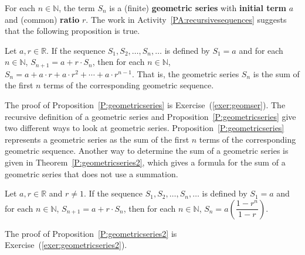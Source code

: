 \noindent
For each  $n \in \mathbb{N}$, the term  $S_n $ is a (finite) \textbf{geometric series}
\label{geometricseries}
%
 with \textbf{initial term}  $a$  and (common) \textbf{ratio}  $r$.  The work in \typeu Activity~\ref*{PA:recursivesequences} suggests that the following proposition is true.

\begin{theorem} \label{P:geometricseries}
Let  $a, r \in \mathbb{R}$.  If the sequence  $S_1 ,S_2 , \ldots ,S_n , \ldots $ is defined by  $S_1  = a$ and for each  $n \in \mathbb{N}$,  $S_{n + 1}  = a + r \cdot S_n $, then for each  $n \in \mathbb{N}$,   $S_n  = a + a \cdot r + a \cdot r^2  +  \cdots  + a \cdot r^{n - 1} $.  That is, the geometric series  $S_n $ is the sum of the first  $n$  terms of the corresponding geometric sequence.
\end{theorem}
%
The proof of Proposition~\ref{P:geometricseries} is Exercise~(\ref{exer:geomser}).
%
The recursive definition of a geometric series and Proposition~\ref{P:geometricseries} give two different ways to look at geometric series.   Proposition~\ref{P:geometricseries} represents a geometric series as the sum of the first  $n$  terms of the corresponding geometric sequence.  Another way to determine the sum of a geometric series is given in Theorem~\ref{P:geometricseries2}, which gives a formula for the sum of a geometric series that does not use a summation.

\begin{theorem} \label{P:geometricseries2}
Let  $a, r \in \mathbb{R}$ and  $r \ne 1$.  If the sequence  $S_1 ,S_2 , \ldots ,S_n , \ldots $ is defined by  $S_1  = a$ and for each  $n \in \mathbb{N}$,  $S_{n + 1}  = a + r \cdot S_n $, then for each  $n \in \mathbb{N}$,   $S_n  = a\left( {\dfrac{{1 - r^n }}{{1 - r}}} \right)$.
\end{theorem}

The proof of Proposition~\ref{P:geometricseries2} is Exercise~(\ref{exer:geometricseries2}).

\endinput

